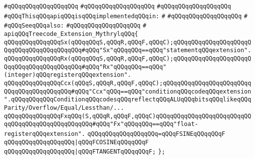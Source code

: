 \verb|#qQQqqQQqqQQqqQQqqQQq|\newline
\verb|#qQQqqQQqqQQqqQQqqQQq|\newline
\verb|#qQQqqQQqqQQqqQQqqQQq|\newline
\newline
\verb|#qQQqThisqQQqapiqQQqisqQQqimplementedqQQqin:|\newline
\verb|#|\newline
\verb|#qQQqqQQqqQQqqQQqqQQq|\newline
\verb|#|\newline
\verb|#qQQqSeeqQQqalso:|\newline
\verb|#qQQqqQQqqQQqqQQqqQQq|\newline
\verb|#|\newline
\verb|apiqQQqTreecode_Extension_MythrylqQQq{|\newline
\newline
\verb|qQQqqQQqqQQqqQQqSx(qQQqqQQqS,qQQqR,qQQqF,qQQqC);qQQqqQQqqQQqqQQqqQQqqQQqqQQqqQQqqQQqqQQqqQQq#qQQq"Sx"qQQqqQQq==qQQq"statementqQQqextension".|\newline
\verb|qQQqqQQqqQQqqQQqRx(qQQqqQQqS,qQQqR,qQQqF,qQQqC);qQQqqQQqqQQqqQQqqQQqqQQqqQQqqQQqqQQqqQQqqQQq#qQQq"Rx"qQQqqQQq==qQQq"(integer)qQQqregisterqQQqextension".|\newline
\verb|qQQqqQQqqQQqqQQqCcx(qQQqS,qQQqR,qQQqF,qQQqC);qQQqqQQqqQQqqQQqqQQqqQQqqQQqqQQqqQQqqQQqqQQq#qQQq"Ccx"qQQq==qQQq"conditionqQQqcodeqQQqextension".qQQqqQQqqQQqConditionqQQqcodesqQQqreflectqQQqALUqQQqbitsqQQqlikeqQQqParity/Overflow/Equal/Lessthan/...|\newline
\newline
\verb|qQQqqQQqqQQqqQQqFxqQQq(S,qQQqR,qQQqF,qQQqC)qQQqqQQqqQQqqQQqqQQqqQQqqQQqqQQqqQQqqQQqqQQqqQQqqQQq#qQQq"Fx"qQQqqQQq==qQQq"float-registerqQQqextension".|\newline
\verb|qQQqqQQqqQQqqQQqqQQq=qQQqFSINEqQQqqQQqF|\newline
\verb|qQQqqQQqqQQqqQQqqQQq|\verb#|qQQqFCOSINEqQQqqQQqF#\newline
\verb|qQQqqQQqqQQqqQQqqQQq|\verb#|qQQqFTANGENTqQQqqQQqF;#\newline
\verb|};|\newline

